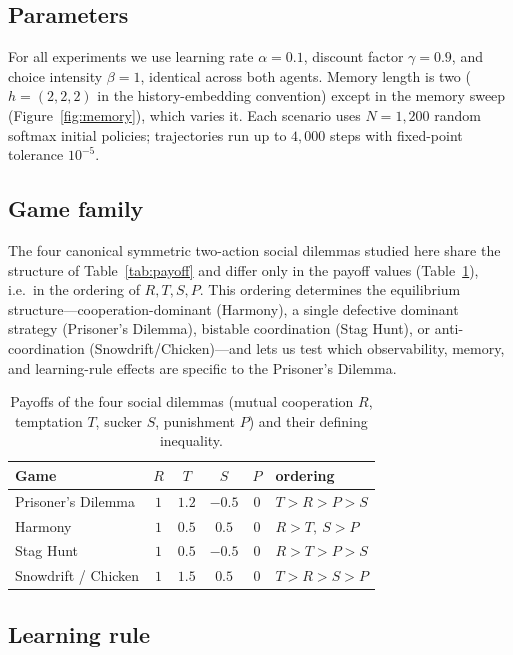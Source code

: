 \documentclass{article}
\begin{document}
\subsection{Parameters}

For all experiments we use learning rate $\alpha=0.1$, discount factor $\gamma=0.9$, and choice intensity $\beta=1$, identical across both agents. Memory length is two ($h=(2,2,2)$ in the history-embedding convention) except in the memory sweep (Figure~\ref{fig:memory}), which varies it. Each scenario uses $N=1{,}200$ random softmax initial policies; trajectories run up to $4{,}000$ steps with fixed-point tolerance $10^{-5}$.

\subsection{Game family}

The four canonical symmetric two-action social dilemmas studied here share the structure of Table~\ref{tab:payoff} and differ only in the payoff values (Table~\ref{tab:games}), i.e.\ in the ordering of $R,T,S,P$. This ordering determines the equilibrium structure---cooperation-dominant (Harmony), a single defective dominant strategy (Prisoner's Dilemma), bistable coordination (Stag Hunt), or anti-coordination (Snowdrift/Chicken)---and lets us test which observability, memory, and learning-rule effects are specific to the Prisoner's Dilemma.

\begin{table}[h!]
  \caption{Payoffs of the four social dilemmas (mutual cooperation $R$, temptation $T$, sucker $S$, punishment $P$) and their defining inequality.}
  \label{tab:games}
  \centering
  \begin{tabular}{lccccl}
    \toprule
    Game & $R$ & $T$ & $S$ & $P$ & ordering \\
    \midrule
    Prisoner's Dilemma & $1$ & $1.2$ & $-0.5$ & $0$ & $T>R>P>S$ \\
    Harmony & $1$ & $0.5$ & $0.5$ & $0$ & $R>T,\ S>P$ \\
    Stag Hunt & $1$ & $0.5$ & $-0.5$ & $0$ & $R>T>P>S$ \\
    Snowdrift / Chicken & $1$ & $1.5$ & $0.5$ & $0$ & $T>R>S>P$ \\
    \bottomrule
  \end{tabular}
\end{table}

\subsection{Learning rule}
\end{document}
